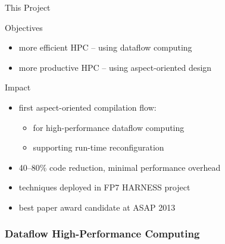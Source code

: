 \begin{frame}{This Project}
  \begin{beamerboxesrounded}{Objectives}
    \begin{itemize}
    \item more efficient HPC -- using dataflow computing
    \item more productive HPC -- using aspect-oriented design
    \end{itemize}
  \end{beamerboxesrounded}
  \vspace{0.5cm}
  \begin{beamerboxesrounded}{Impact}
    \begin{itemize}
      \item first aspect-oriented compilation flow:
      \begin{itemize}
      \item for high-performance dataflow computing
      \item supporting run-time reconfiguration
      \end{itemize}
    \item 40--80\% code reduction, minimal performance overhead
    \item techniques deployed in FP7 HARNESS project
    \item best paper award candidate at ASAP 2013
    \end{itemize}
  \end{beamerboxesrounded}
\end{frame}

\begin{frame}
  \frametitle{Dataflow High-Performance Computing}
  \begin{figure}[!ht]
    \centering
    \def\svgwidth{0.9\linewidth}
    
  \end{figure}
\end{frame}

